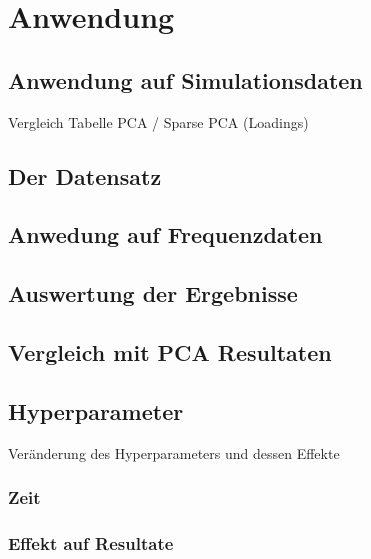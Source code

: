 \chapter{Anwendung}

\label{application}

\section{Anwendung auf Simulationsdaten}
Vergleich Tabelle PCA / Sparse PCA (Loadings)

\section{Der Datensatz}

\section{Anwedung auf Frequenzdaten}

\section{Auswertung der Ergebnisse}

\section{Vergleich mit PCA Resultaten}

\section{Hyperparameter}
Veränderung des Hyperparameters und dessen Effekte
\subsection{Zeit}
\subsection{Effekt auf Resultate}